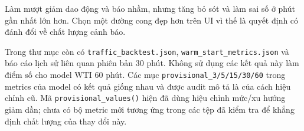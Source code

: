     

    Làm mượt giảm dao động và báo nhầm, nhưng tăng bỏ sót và làm sai số ở phút gần nhất lớn hơn. Chọn một đường cong đẹp hơn trên UI vì thế là quyết định có đánh đổi về chất lượng cảnh báo.

    Trong thư mục còn có \texttt{traffic\_backtest.json}, \texttt{warm\_start\_metrics.json} và báo cáo lịch sử liên quan phiên bản 30 phút. Không sử dụng các kết quả này làm điểm số cho model WTI 60 phút. Các mục \texttt{provisional\_3/5/15/30/60} trong metrics của model có kết quả giống nhau và được audit mô tả là của cách hiệu chỉnh cũ. Mã \texttt{provisional\_values()} hiện đã dùng hiệu chỉnh mức/xu hướng giảm dần; chưa có bộ metric mới tương ứng trong các tệp đã kiểm tra để khẳng định chất lượng của thay đổi này.

